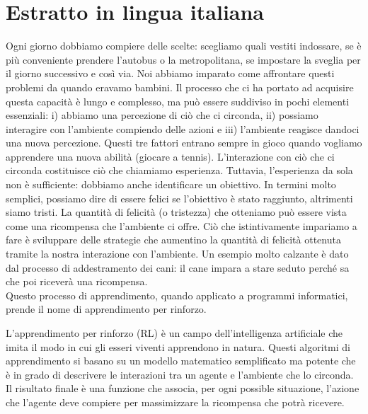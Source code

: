 \chapter*{Estratto in lingua italiana}

Ogni giorno dobbiamo compiere delle scelte: scegliamo quali vestiti indossare, se è più conveniente prendere l'autobus o la metropolitana, se impostare la sveglia per il giorno successivo e così via. Noi abbiamo imparato come affrontare questi problemi da quando eravamo bambini. Il processo che ci ha portato ad acquisire questa capacità è lungo e complesso, ma può essere suddiviso in pochi elementi essenziali: i) abbiamo una percezione di ciò che ci circonda, ii) possiamo interagire con l'ambiente compiendo delle azioni e iii) l'ambiente reagisce dandoci una nuova percezione. Questi tre fattori entrano sempre in gioco quando vogliamo apprendere una nuova abilità (\eg giocare a tennis). 
L'interazione con ciò che ci circonda costituisce ciò che chiamiamo esperienza. Tuttavia, l'esperienza da sola non è sufficiente: dobbiamo anche identificare un obiettivo. In termini molto semplici, possiamo dire di essere felici se l'obiettivo è stato raggiunto, altrimenti siamo tristi. La quantità di felicità (o tristezza) che otteniamo può essere vista come una ricompensa che l'ambiente ci offre. Ciò che istintivamente impariamo a fare è sviluppare delle strategie che aumentino la quantità di felicità ottenuta tramite la nostra interazione con l'ambiente. Un esempio molto calzante è dato dal processo di addestramento dei cani: il cane impara a stare seduto perché sa che poi riceverà una ricompensa.\\
Questo processo di apprendimento, quando applicato a programmi informatici, prende il nome di apprendimento per rinforzo.



L'apprendimento per rinforzo (RL) è un campo dell'intelligenza artificiale che imita il modo in cui gli esseri viventi apprendono in natura. Questi algoritmi di apprendimento si basano su un modello matematico semplificato ma potente che è in grado di descrivere le interazioni tra un agente e l'ambiente che lo circonda.
%
Il risultato finale è una funzione che associa, per ogni possible situazione, l'azione che l'agente deve compiere per massimizzare la ricompensa che potrà ricevere.


